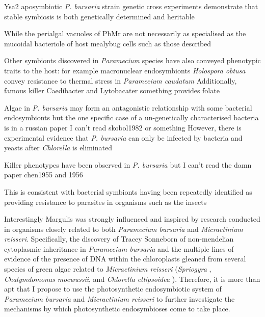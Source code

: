 Ysa2 aposymbiotic \textit{P. bursaria} strain genetic cross experiments demonstrate that stable symbiosis
is both genetically determined and heritable \citep{Tonooka2007}




While the perialgal vacuoles of PbMr are not necessarily as specialised as the 
mucoidal bacteriole of host mealybug cells such as those described \citep{vonDohlen2001}


Other symbionts discovered in \textit{Paramecium} species have also conveyed phenotypic traits to the host:
for example macronuclear endosymbionts \textit{Holospora obtusa} convey resistance to thermal stress in \textit{Paramecium caudatum} 
\citep{Fujishima2005}
Additionally, famous killer Caedibacter and Lytobacater something provides folate


Algae in \textit{P. bursaria} may form an antagonistic relationship with some bacterial endosymbionts but the one specific case
of a un-genetically characterised bacteria is in a russian paper I can't read skobol1982 or something 
However, there is experimental evidence that \textit{P. bursaria} can only be infected by bacteria and yeasts after
\textit{Chlorella} is eliminated \citep{Gortz1982}

Killer phenotypes have been observed in \textit{P. bursaria} but I can't read the damn paper chen1955 and 1956 \citep{Gortz2009}


This is consistent with bacterial symbionts having been repeatedly identified as providing resistance to parasites in organisms
such as the insects \citep{Martinez2014}


Interestingly Margulis was strongly influenced and inspired by research conducted
in organisms closely related to both \textit{Paramecium bursaria} and 
\textit{Micractinium reisseri}. Specifically, the discovery of Tracey Sonneborn
of non-mendelian cytoplasmic inheritance in \textit{Paramecium bursaria} \citep{Sonneborn1950}
and the multiple lines of evidence of the presence of DNA within the chloroplasts
gleaned from several species of green algae related to \textit{Micractinium reisseri}
(\textit{Spriogyra} \citep{Stocking1959}, \textit{Chalymdomonas moewussii}, and 
\textit{Chlorella ellipsoidea} \cite{Ris1962}).  Therefore, it is more than apt
that I propose to use the photosynthetic endosymbiotic system of \textit{Paramecium bursaria}
and \textit{Micractinium reisseri} to further investigate the mechanisms by which
photosynthetic endosymbioses come to take place.





